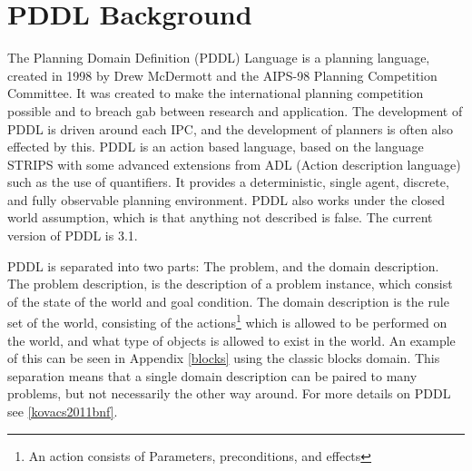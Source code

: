 \section{PDDL Background}
The Planning Domain Definition (PDDL) Language is a planning language, created in 1998 by Drew McDermott and the AIPS-98 Planning Competition Committee. It was created to make the international planning competition possible and to breach gab between research and application. The development of PDDL is driven around each IPC, and the development of planners is often also effected by this.
PDDL is an action based language, based on the language STRIPS with some advanced extensions from ADL (Action description language) such as the use of quantifiers. It provides a deterministic, single agent, discrete, and fully observable planning environment. PDDL also works under the closed world assumption, which is that anything not described is false. The current version of PDDL is 3.1.


PDDL is separated into two parts: The problem, and the domain description. The problem description, is the description of a problem instance, which consist of the state of the world and goal condition. The domain description is the rule set of the world, consisting of the actions\footnote{An action consists of Parameters, preconditions, and effects} which is allowed to be performed on the world, and what type of objects is allowed to exist in the world. An example of this can be seen in Appendix \ref{blocks} using the classic blocks domain. This separation means that a single domain description can be paired to many problems, but not necessarily the other way around. For more details on PDDL see \ref{kovacs2011bnf}.
